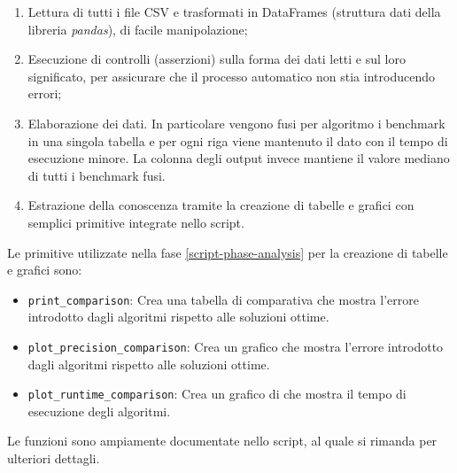 \begin{enumerate}
    \item Lettura di tutti i file CSV e trasformati in DataFrames
      (struttura dati della libreria \emph{pandas}), di facile
      manipolazione;
    \item Esecuzione di controlli (asserzioni) sulla forma dei dati
      letti e sul loro significato, per assicurare che il processo
      automatico non stia introducendo errori;
    \item Elaborazione dei dati. In particolare vengono fusi per
      algoritmo i benchmark in una singola tabella e per ogni riga
      viene mantenuto il dato con il tempo di esecuzione minore. La
      colonna degli output invece mantiene il valore mediano di tutti
      i benchmark fusi.
    \item Estrazione della conoscenza tramite la creazione di tabelle
      e grafici con semplici primitive integrate nello script.
    \label{script-phase-analysis}
\end{enumerate}

\noindent Le primitive utilizzate nella fase
\ref{script-phase-analysis} per la creazione di tabelle e grafici
sono:

\begin{itemize}
    \item \texttt{print_comparison}: Crea una tabella di
      comparativa che mostra l'errore introdotto dagli algoritmi rispetto alle soluzioni ottime.

    \item \texttt{plot_precision_comparison}: Crea un
      grafico che mostra l'errore introdotto dagli algoritmi rispetto alle soluzioni ottime.

    \item \texttt{plot_runtime_comparison}: Crea un
      grafico di che mostra il tempo di esecuzione degli algoritmi.

\end{itemize}

\noindent Le funzioni sono ampiamente documentate nello script, al
quale si rimanda per ulteriori dettagli.
